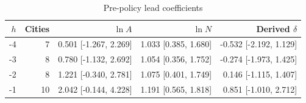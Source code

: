 \begin{table}[htbp]
\centering\small
\caption{Pre-policy lead coefficients}\label{tab:leads}
\begin{tabular}{rrrrr}
\toprule
$h$ & Cities & $\ln A$ & $\ln N$ & Derived $\delta$ \\
\midrule
-4 & 7 & 0.501 [-1.267, 2.269] & 1.033 [0.385, 1.680] & -0.532 [-2.192, 1.129] \\
-3 & 8 & 0.780 [-1.132, 2.692] & 1.054 [0.356, 1.752] & -0.274 [-1.973, 1.425] \\
-2 & 8 & 1.221 [-0.340, 2.781] & 1.075 [0.401, 1.749] & 0.146 [-1.115, 1.407] \\
-1 & 10 & 2.042 [-0.144, 4.228] & 1.191 [0.565, 1.818] & 0.851 [-1.010, 2.712] \\
\bottomrule
\end{tabular}
\end{table}
